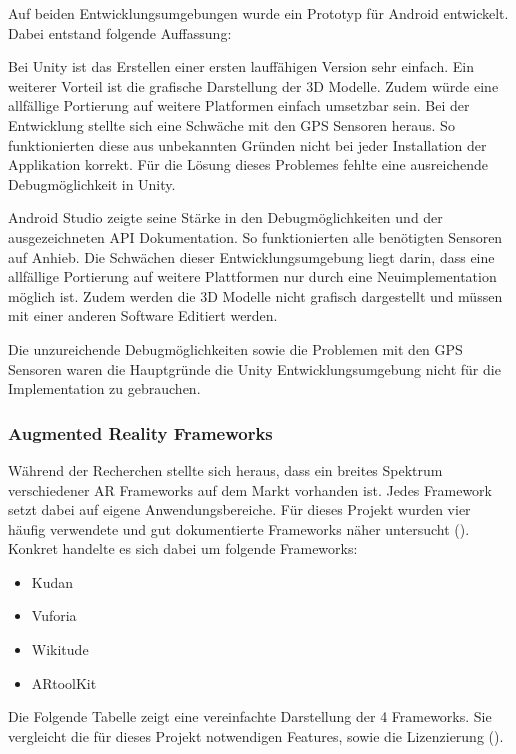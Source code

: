 \documentclass[a4paper]{scrreprt}
\begin{document}
Auf beiden Entwicklungsumgebungen wurde ein Prototyp für Android entwickelt. Dabei entstand folgende Auffassung:

Bei Unity ist das Erstellen einer ersten lauffähigen Version sehr einfach. Ein weiterer Vorteil ist die grafische Darstellung der 3D Modelle. Zudem würde eine allfällige Portierung auf weitere Platformen einfach umsetzbar sein. Bei der Entwicklung stellte sich eine Schwäche mit den GPS Sensoren heraus. So funktionierten diese aus unbekannten Gründen nicht bei jeder Installation der Applikation korrekt. Für die Lösung dieses Problemes fehlte eine ausreichende Debugmöglichkeit in Unity.

Android Studio zeigte seine Stärke in den Debugmöglichkeiten und der ausgezeichneten API Dokumentation. So funktionierten alle benötigten Sensoren auf Anhieb. Die Schwächen dieser Entwicklungsumgebung liegt darin, dass eine allfällige Portierung auf weitere Plattformen nur durch eine Neuimplementation möglich ist. Zudem werden die 3D Modelle nicht grafisch dargestellt und müssen mit einer anderen Software Editiert werden.

Die unzureichende Debugmöglichkeiten sowie die Problemen mit den GPS Sensoren waren die Hauptgründe die Unity Entwicklungsumgebung nicht für die Implementation zu gebrauchen.

\subsubsection{Augmented Reality Frameworks}
Während der Recherchen stellte sich heraus, dass ein breites Spektrum verschiedener AR Frameworks auf dem Markt vorhanden ist. Jedes Framework setzt dabei auf eigene Anwendungsbereiche. Für dieses Projekt wurden vier häufig verwendete und gut dokumentierte Frameworks näher untersucht (\cite{DDIDevelopment}). Konkret handelte es sich dabei um folgende Frameworks:
\begin{itemize}
\item Kudan
\item Vuforia
\item Wikitude
\item ARtoolKit
\end{itemize}

Die Folgende Tabelle zeigt eine vereinfachte Darstellung der 4 Frameworks. Sie vergleicht die für dieses Projekt notwendigen Features, sowie die Lizenzierung (\cite{DDIDevelopment}).
\end{document}
